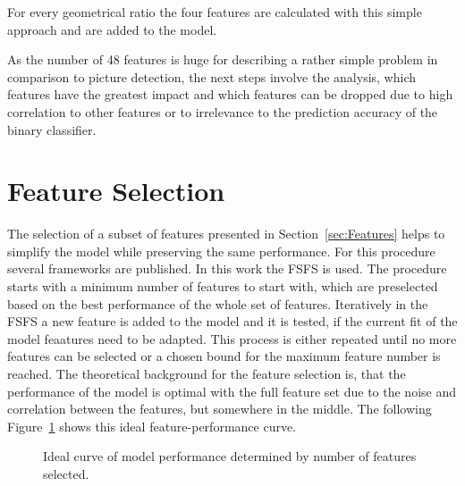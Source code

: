 For every geometrical ratio the four features are calculated with this simple approach and are added to the model.

\parbreak

As the number of 48 features is huge for describing a rather simple problem in comparison to picture detection, the next steps
involve the analysis, which features have the greatest impact and which features can be dropped due to high correlation to other
features or to irrelevance to the prediction accuracy of the binary classifier.

\section{Feature Selection}
\label{sec:feature_engineering}

The selection of a subset of features presented in Section~\ref{sec:Features} helps to simplify the model
while preserving the same performance. For this procedure several frameworks are published. In this work
the \gls{FSFS} is used. The procedure starts with a minimum number of features to start with, which are
preselected based on the best performance of the whole set of features. Iteratively in the \gls{FSFS} a new
feature is added to the model and it is tested, if the current fit of the model feaatures need to be adapted.
This process is either repeated until no more features can be selected or a chosen bound for the maximum
feature number is reached. The theoretical background for the feature selection is, that the performance
of the model is optimal with the full feature set due to the noise and correlation between the features,
but somewhere in the middle. The following Figure~\ref{fig:feature-performance} shows this ideal feature-performance curve.

\begin{figure}[ht]
    \centering
    \caption{Ideal curve of model performance determined by number of features selected.}
    \label{fig:feature-performance}
\end{figure}

